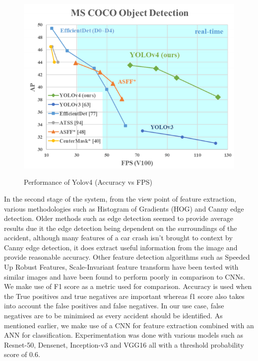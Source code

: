 \documentclass[ 12pt,a4paper,twocolumn,fleqn]{article}
\begin{document}
\begin{adjustwidth}{3.5em}{0pt}
  \begin{figure}[H]
\begin{center}
    \hspace*{0.4in}
    \includegraphics[scale=0.5]{media/res.png}
    \\
  \caption{ Performance of Yolov4 (Accuracy vs FPS)}
\end{center}
  \end{figure}


\hspace{0.2cm}
    
In the second stage of the system, from the view point of feature extraction, various methodologies such as Histogram of Gradients (HOG) and Canny edge detection. Older methods such as edge detection seemed to provide average results due it the edge detection being dependent on the surroundings of the accident, although many features of a car crash isn’t brought to context by Canny edge detection, it does extract useful information from the image and provide reasonable accuracy. Other feature detection algorithms such as Speeded Up Robust Features, Scale-Invariant feature transform have been tested with similar images and have been found to perform poorly in comparison to CNNs.
We make use of F1 score as a metric used for comparison. Accuracy is used when the True positives and true negatives are important whereas f1 score also takes into account the false positives and false negatives. In our use case, false negatives are to be minimised as every accident should be identified.
As mentioned earlier, we make use of a CNN for feature extraction combined with an ANN for classification. Experimentation was done with various models such as Resnet-50, Densenet, Inception-v3 and VGG16 all with a threshold probability score of 0.6.


\end{adjustwidth}
\end{document}
